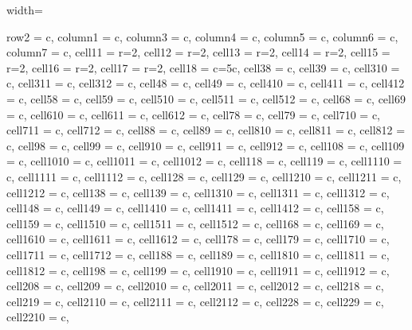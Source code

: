 \documentclass[lettersize,journal]{IEEEtran}
\begin{document}
\begin{table}
\caption{Performance of the transfer learning experiments over AlexNet pre-trained model.}
\centering
\begin{adjustbox}{width=\textwidth}
\begin{tblr}{
  row{2} = {c},  column{1} = {c}, column{3} = {c},  column{4} = {c},  column{5} = {c},
  column{6} = {c},  column{7} = {c},  cell{1}{1} = {r=2}{},  cell{1}{2} = {r=2}{},
  cell{1}{3} = {r=2}{},  cell{1}{4} = {r=2}{},  cell{1}{5} = {r=2}{},  cell{1}{6} = {r=2}{},
  cell{1}{7} = {r=2}{},  cell{1}{8} = {c=5}{c},  cell{3}{8} = {c},  cell{3}{9} = {c},
  cell{3}{10} = {c},  cell{3}{11} = {c},  cell{3}{12} = {c},  cell{4}{8} = {c},
  cell{4}{9} = {c},  cell{4}{10} = {c},  cell{4}{11} = {c},  cell{4}{12} = {c},
  cell{5}{8} = {c},  cell{5}{9} = {c},  cell{5}{10} = {c},  cell{5}{11} = {c},
  cell{5}{12} = {c},  cell{6}{8} = {c},  cell{6}{9} = {c},  cell{6}{10} = {c},
  cell{6}{11} = {c},  cell{6}{12} = {c},  cell{7}{8} = {c},  cell{7}{9} = {c},
  cell{7}{10} = {c},  cell{7}{11} = {c},  cell{7}{12} = {c},  cell{8}{8} = {c},
  cell{8}{9} = {c},  cell{8}{10} = {c},  cell{8}{11} = {c},  cell{8}{12} = {c},
  cell{9}{8} = {c},  cell{9}{9} = {c},  cell{9}{10} = {c},  cell{9}{11} = {c},
  cell{9}{12} = {c},  cell{10}{8} = {c},  cell{10}{9} = {c},  cell{10}{10} = {c},
  cell{10}{11} = {c},  cell{10}{12} = {c},  cell{11}{8} = {c},  cell{11}{9} = {c},
  cell{11}{10} = {c},  cell{11}{11} = {c},  cell{11}{12} = {c},  cell{12}{8} = {c},
  cell{12}{9} = {c},  cell{12}{10} = {c},  cell{12}{11} = {c},  cell{12}{12} = {c},
  cell{13}{8} = {c},  cell{13}{9} = {c},  cell{13}{10} = {c},  cell{13}{11} = {c},
  cell{13}{12} = {c},  cell{14}{8} = {c},  cell{14}{9} = {c},  cell{14}{10} = {c},
  cell{14}{11} = {c},  cell{14}{12} = {c},  cell{15}{8} = {c},  cell{15}{9} = {c},
  cell{15}{10} = {c},  cell{15}{11} = {c},  cell{15}{12} = {c},  cell{16}{8} = {c},
  cell{16}{9} = {c},  cell{16}{10} = {c},  cell{16}{11} = {c},  cell{16}{12} = {c},
  cell{17}{8} = {c},  cell{17}{9} = {c},  cell{17}{10} = {c},  cell{17}{11} = {c},
  cell{17}{12} = {c},  cell{18}{8} = {c},  cell{18}{9} = {c},  cell{18}{10} = {c},
  cell{18}{11} = {c},  cell{18}{12} = {c},  cell{19}{8} = {c},  cell{19}{9} = {c},
  cell{19}{10} = {c},  cell{19}{11} = {c},  cell{19}{12} = {c},  cell{20}{8} = {c},
  cell{20}{9} = {c},  cell{20}{10} = {c},  cell{20}{11} = {c},  cell{20}{12} = {c},
  cell{21}{8} = {c},  cell{21}{9} = {c},  cell{21}{10} = {c},  cell{21}{11} = {c},
  cell{21}{12} = {c},  cell{22}{8} = {c},  cell{22}{9} = {c},  cell{22}{10} = {c},
}
\end{tblr}
\end{adjustbox}
\end{table}
\end{document}
